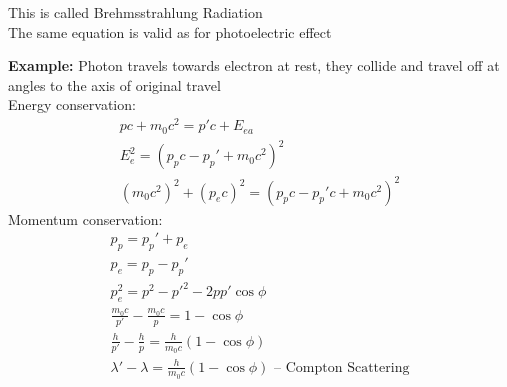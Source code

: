 \documentclass[a4paper, 11pt, fleqn, normalem]{report}
\begin{document}
This is called Brehmsstrahlung Radiation \\
The same equation is valid as for photoelectric effect

\textbf{Example: }Photon travels towards electron at rest, they collide and travel off at angles to the axis of original travel \\
Energy conservation:
\begin{gather*}
    pc + m_{0}c^{2} = p'c + E_{ea} \\
    E_{e}^{2} = (p_{p}c - p_{p}' + m_{0}c^{2})^{2} \\
    (m_{0}c^{2})^{2} + (p_{e}c)^{2} = (p_{p}c - p_{p}'c + m_{0}c^{2})^{2}
\end{gather*}
Momentum conservation:
\begin{gather*}
    p_{p} = p_{p}' + p_{e} \\
    p_{e} = p_{p} - p_{p}' \\
    p_{e}^{2} = p^{2} - p'^{2} - 2pp'\cos{\phi} \\
    \frac{m_{0}c}{p'} - \frac{m_{0}c}{p} = 1 - \cos{\phi} \\
    \frac{h}{p'} - \frac{h}{p} = \frac{h}{m_{0}c}(1 - \cos{\phi}) \\
    \lambda' - \lambda = \frac{h}{m_{0}c}(1 - \cos{\phi})\text{ -- Compton Scattering}
\end{gather*}
\end{document}
